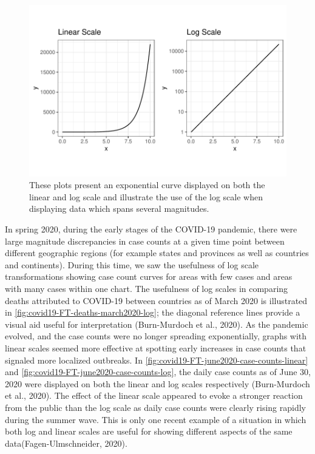 \documentclass[print]{nuthesis}
\begin{document}
\begin{figure}[tbp]

{\centering \includegraphics[width=1\linewidth,]{thesis_files/figure-latex/log-scales-1} 

}

\caption[Linear scale versus log scale]{These plots present an exponential curve displayed on both the linear and log scale and illustrate the use of the log scale when displaying data which spans several magnitudes.}\label{fig:log-scales}
\end{figure}

In spring 2020, during the early stages of the COVID-19 pandemic, there were large magnitude discrepancies in case counts at a given time point between different geographic regions (for example states and provinces as well as countries and continents).
During this time, we saw the usefulness of log scale transformations showing case count curves for areas with few cases and areas with many cases within one chart.
The usefulness of log scales in comparing deaths attributed to COVID-19 between countries as of March 2020 is illustrated in \cref{fig:covid19-FT-deaths-march2020-log}; the diagonal reference lines provide a visual aid useful for interpretation (Burn-Murdoch et al., 2020).
As the pandemic evolved, and the case counts were no longer spreading exponentially, graphs with linear scales seemed more effective at spotting early increases in case counts that signaled more localized outbreaks. In \cref{fig:covid19-FT-june2020-case-counts-linear} and \cref{fig:covid19-FT-june2020-case-counts-log}, the daily case counts as of June 30, 2020 were displayed on both the linear and log scales respectively (Burn-Murdoch et al., 2020).
The effect of the linear scale  appeared to evoke a stronger reaction from the public than the log scale  as daily case counts were clearly rising rapidly during the summer wave.
This is only one recent example of a situation in which both log and linear scales are useful for showing different aspects of the same data(Fagen-Ulmschneider, 2020).
\end{document}
